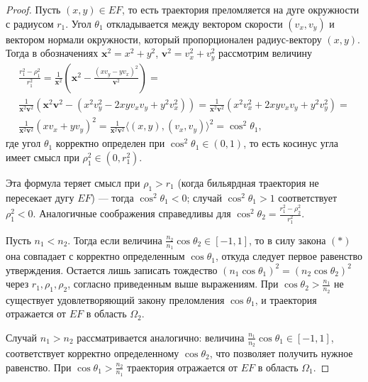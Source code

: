 \begin{proof}
Пусть $(x,y) \in EF$, то есть траектория преломляется на дуге окружности с радиусом $r_1$. 
Угол $\theta_1$ откладывается между вектором скорости $(v_x, v_y)$ и вектором нормали окружности, который пропорционален радиус-вектору $(x,y)$. Тогда в обозначениях $\textbf{x}^2 = x^2+y^2$, $\textbf{v}^2=v_x^2+v_y^2$ рассмотрим величину
\begin{multline*}
\frac{r_1^2-\rho_1^2}{r_1^2} = \frac{1}{\textbf{x}^2} \left(\textbf{x}^2- \frac{(x v_y-y v_x)^2}{\textbf{v}^2}  \right) = \\
\frac{1}{\textbf{x}^2 \textbf{v}^2}\left( \textbf{x}^2 \textbf{v}^2 - (x^2 v_y^2 - 2xyv_xv_y+y^2v_x^2) \right) =
 \frac{1}{\textbf{x}^2\textbf{v}^2}\left( x^2 v_x^2 + 2xyv_xv_y+y^2v_y^2 \right) = \\
  \frac{1}{\textbf{x}^2\textbf{v}^2}(x v_x + y v_y)^2 = 
  \frac{1}{\textbf{x}^2\textbf{v}^2}\langle (x, y) , (v_x, v_y) \rangle^2 =
\cos^2 \theta_1,
\end{multline*}
где угол $\theta_1$ корректно определен при $\cos^2 \theta_1 \in (0,1)$, то есть косинус угла имеет смысл при $\rho_1^2 \in (0, r_1^2)$. 

Эта формула теряет смысл при $\rho_1 > r_1$ (когда бильярдная траектория не пересекает дугу $EF$) --- тогда $\cos^2 \theta_1 < 0$; случай $\cos^2 \theta_1 > 1$ соответствует $\rho_1^2 < 0$.
Аналогичные соображения справедливы для $\cos^2 \theta_2 = \frac{r_1^2-\rho_2^2}{r_1^2}$.

Пусть $n_1 < n_2$. Тогда если величина $\frac{n_2}{n_1} \cos \theta_2 \in [-1,1]$, то в силу закона $(\ast)$ она совпадает с корректно определенным $\cos \theta_1$, откуда следует первое равенство утверждения. 
Остается лишь записать тождество  $(n_1 \cos \theta_1)^2 = (n_2 \cos \theta_2)^2$ через $r_1, \rho_1, \rho_2$, согласно приведенным выше выражениям.
При $\cos \theta_2 > \frac{n_1}{n_2}$ не существует удовлетворяющий закону преломления $\cos \theta_1$, и траектория отражается от $EF$ в область $\Omega_2$. 

Случай $n_1 > n_2$ рассматривается аналогично: величина $\frac{n_1}{n_2} \cos \theta_1 \in [-1,1]$, соответствует корректно определенному  $\cos \theta_2$, что позволяет получить нужное равенство. При $\cos \theta_1 > \frac{n_2}{n_1}$ траектория отражается от $EF$ в область $\Omega_1$. 



\end{proof}
